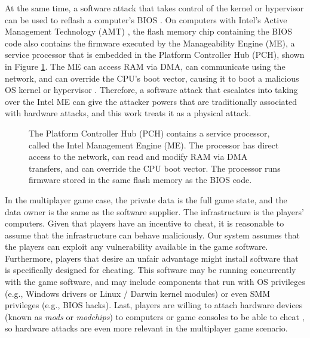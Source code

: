 At the same time, a software attack that takes control of the kernel or
hypervisor can be used to reflash a computer's BIOS \cite{wojtczuk2010bios}. On
computers with Intel's Active Management Technology (AMT) \cite{intel2013amt},
the flash memory chip containing the BIOS code also contains the firmware
executed by the Manageability Engine (ME), a service processor that is embedded
in the Platform Controller Hub (PCH), shown in Figure \ref{fig:pch}. The ME can
access RAM via DMA, can communicate using the network, and can override the
CPU's boot vector, causing it to boot a malicious OS kernel or hypervisor
\cite{tereshkin2009amt}. Therefore, a software attack that escalates into
taking over the Intel ME can give the attacker powers that are traditionally
associated with hardware attacks, and this work treats it as a physical attack.

\begin{figure}[hbtp]
  \caption{
    The Platform Controller Hub (PCH) contains a service processor, called the
    Intel Management Engine (ME). The processor has direct access to the
    network, can read and modify RAM via DMA transfers, and can override the
    CPU boot vector. The processor runs firmware stored in the same flash
    memory as the BIOS code.
  }
  \label{fig:pch}
\end{figure}

In the multiplayer game case, the private data is the full game state, and the
data owner is the same as the software supplier. The infrastructure is the
players' computers. Given that players have an incentive to cheat, it is
reasonable to assume that the infrastructure can behave maliciously. Our system
assumes that the players can exploit any vulnerability available in the game
software. Furthermore, players that desire an unfair advantage might install
software that is specifically designed for cheating. This software may be
running concurrently with the game software, and may include components that
run with OS privileges (e.g., Windows drivers or Linux / Darwin kernel
modules) or even SMM privileges (e.g., BIOS hacks). Last, players are willing
to attach hardware devices (known as \textit{mods} or \textit{modchips}) to
computers or game consoles to be able to cheat \cite{harris2007mod}, so
hardware attacks are even more relevant in the multiplayer game scenario.

